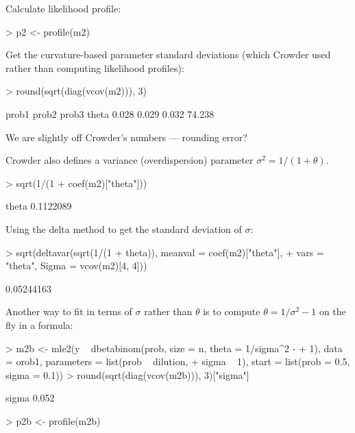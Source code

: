 \documentclass{article}
\begin{document}
Calculate likelihood profile:
\begin{Schunk}
\begin{Sinput}
> p2 <- profile(m2)
\end{Sinput}
\end{Schunk}

Get the curvature-based parameter standard
deviations (which Crowder used
rather than computing likelihood profiles):
\begin{Schunk}
\begin{Sinput}
> round(sqrt(diag(vcov(m2))), 3)
\end{Sinput}
\begin{Soutput}
 prob1  prob2  prob3  theta 
 0.028  0.029  0.032 74.238 
\end{Soutput}
\end{Schunk}
We are slightly off Crowder's numbers --- rounding
error?

Crowder also defines a variance (overdispersion) parameter
$\sigma^2=1/(1+\theta)$.
\begin{Schunk}
\begin{Sinput}
> sqrt(1/(1 + coef(m2)["theta"]))
\end{Sinput}
\begin{Soutput}
    theta 
0.1122089 
\end{Soutput}
\end{Schunk}

Using the delta method to get the standard deviation of
$\sigma$:
\begin{Schunk}
\begin{Sinput}
> sqrt(deltavar(sqrt(1/(1 + theta)), meanval = coef(m2)["theta"], 
+     vars = "theta", Sigma = vcov(m2)[4, 4]))
\end{Sinput}
\begin{Soutput}
[1] 0.05244163
\end{Soutput}
\end{Schunk}

Another way to fit in terms of $\sigma$ rather than $\theta$
is to compute $\theta=1/\sigma^2-1$ on the fly in a
formula:

\begin{Schunk}
\begin{Sinput}
> m2b <- mle2(y ~ dbetabinom(prob, size = n, theta = 1/sigma^2 - 
+     1), data = orob1, parameters = list(prob ~ dilution, 
+     sigma ~ 1), start = list(prob = 0.5, sigma = 0.1))
> round(sqrt(diag(vcov(m2b))), 3)["sigma"]
\end{Sinput}
\begin{Soutput}
sigma 
0.052 
\end{Soutput}
\begin{Sinput}
> p2b <- profile(m2b)
\end{Sinput}
\end{Schunk}
\end{document}
